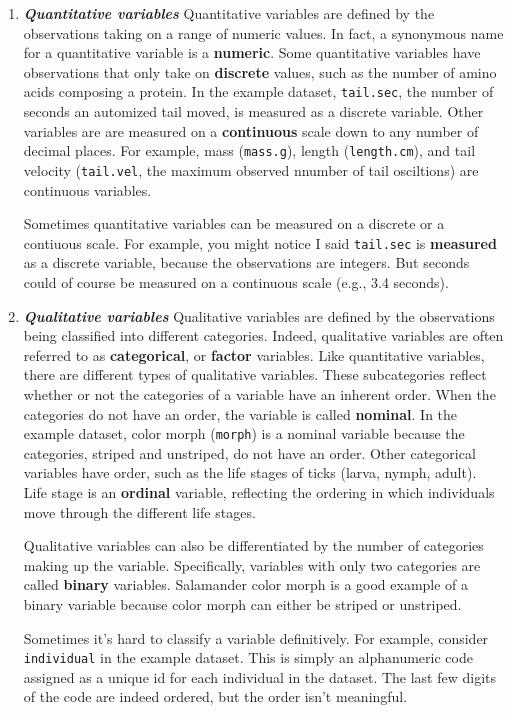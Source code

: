 \documentclass[
]{book}
\begin{document}
\begin{enumerate}
\def\labelenumi{\arabic{enumi}.}
\item
  \textbf{\emph{Quantitative variables}} Quantitative variables are defined by the observations taking on a range of numeric values. In fact, a synonymous name for a quantitative variable is a \textbf{numeric}. Some quantitative variables have observations that only take on \textbf{discrete} values, such as the number of amino acids composing a protein. In the example dataset, \texttt{tail.sec}, the number of seconds an automized tail moved, is measured as a discrete variable. Other variables are are measured on a \textbf{continuous} scale down to any number of decimal places. For example, mass (\texttt{mass.g}), length (\texttt{length.cm}), and tail velocity (\texttt{tail.vel}, the maximum observed nnumber of tail osciltions) are continuous variables.

  Sometimes quantitative variables can be measured on a discrete or a contiuous scale. For example, you might notice I said \texttt{tail.sec} is \textbf{measured} as a discrete variable, because the observations are integers. But seconds could of course be measured on a continuous scale (e.g., 3.4 seconds).
\item
  \textbf{\emph{Qualitative variables}} Qualitative variables are defined by the observations being classified into different categories. Indeed, qualitative variables are often referred to as \textbf{categorical}, or \textbf{factor} variables. Like quantitative variables, there are different types of qualitative variables. These subcategories reflect whether or not the categories of a variable have an inherent order. When the categories do not have an order, the variable is called \textbf{nominal}. In the example dataset, color morph (\texttt{morph}) is a nominal variable because the categories, striped and unstriped, do not have an order. Other categorical variables have order, such as the life stages of ticks (larva, nymph, adult). Life stage is an \textbf{ordinal} variable, reflecting the ordering in which individuals move through the different life stages.

  Qualitative variables can also be differentiated by the number of categories making up the variable. Specifically, variables with only two categories are called \textbf{binary} variables. Salamander color morph is a good example of a binary variable because color morph can either be striped or unstriped.

  Sometimes it's hard to classify a variable definitively. For example, consider \texttt{individual} in the example dataset. This is simply an alphanumeric code assigned as a unique id for each individual in the dataset. The last few digits of the code are indeed ordered, but the order isn't meaningful.
\end{enumerate}
\end{document}
